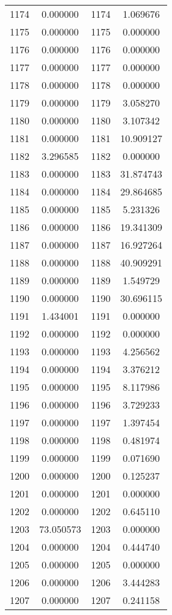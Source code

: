 \documentclass[12pt]{article}
\begin{document}
\begin{longtable}{@{}cccc@{}}
1174 & 0.000000 & 1174 & 1.069676 \\
1175 & 0.000000 & 1175 & 0.000000 \\
1176 & 0.000000 & 1176 & 0.000000 \\
1177 & 0.000000 & 1177 & 0.000000 \\
1178 & 0.000000 & 1178 & 0.000000 \\
1179 & 0.000000 & 1179 & 3.058270 \\
1180 & 0.000000 & 1180 & 3.107342 \\
1181 & 0.000000 & 1181 & 10.909127 \\
1182 & 3.296585 & 1182 & 0.000000 \\
1183 & 0.000000 & 1183 & 31.874743 \\
1184 & 0.000000 & 1184 & 29.864685 \\
1185 & 0.000000 & 1185 & 5.231326 \\
1186 & 0.000000 & 1186 & 19.341309 \\
1187 & 0.000000 & 1187 & 16.927264 \\
1188 & 0.000000 & 1188 & 40.909291 \\
1189 & 0.000000 & 1189 & 1.549729 \\
1190 & 0.000000 & 1190 & 30.696115 \\
1191 & 1.434001 & 1191 & 0.000000 \\
1192 & 0.000000 & 1192 & 0.000000 \\
1193 & 0.000000 & 1193 & 4.256562 \\
1194 & 0.000000 & 1194 & 3.376212 \\
1195 & 0.000000 & 1195 & 8.117986 \\
1196 & 0.000000 & 1196 & 3.729233 \\
1197 & 0.000000 & 1197 & 1.397454 \\
1198 & 0.000000 & 1198 & 0.481974 \\
1199 & 0.000000 & 1199 & 0.071690 \\
1200 & 0.000000 & 1200 & 0.125237 \\
1201 & 0.000000 & 1201 & 0.000000 \\
1202 & 0.000000 & 1202 & 0.645110 \\
1203 & 73.050573 & 1203 & 0.000000 \\
1204 & 0.000000 & 1204 & 0.444740 \\
1205 & 0.000000 & 1205 & 0.000000 \\
1206 & 0.000000 & 1206 & 3.444283 \\
1207 & 0.000000 & 1207 & 0.241158 \\

\end{longtable}
\end{document}
